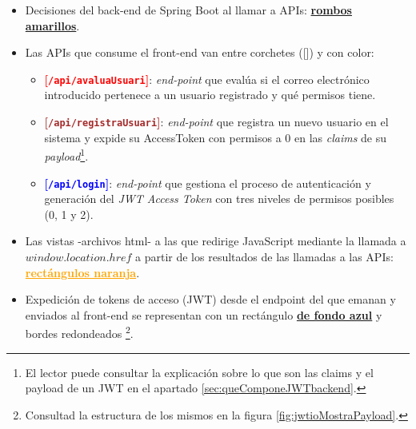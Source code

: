 \documentclass[a4paper,12pt]{report}
\begin{document}
	\begin{itemize}
		\setlength{\itemsep}{-.3em}
		
		\item Decisiones del back-end de Spring Boot al llamar a APIs: \textbf{\textcolor{yellow!75!black}{\underline{rombos amarillos}}}. %
		\item Las APIs que consume el front-end van entre corchetes ([]) y con color:
		\begin{itemize}
			\setlength{\itemsep}{.0em}
			\item \textbf{\textcolor{red}{[\texttt{/api/avaluaUsuari}]}}: \textit{end-point} que evalúa si el correo electrónico introducido pertenece a un usuario registrado y qué permisos tiene.
			\item \textbf{\textcolor{brown}{[\texttt{/api/registraUsuari}]}}: \textit{end-point} que registra un nuevo usuario en el sistema y expide su AccessToken con permisos a 0 en las \textit{claims} de su \textit{payload}\footnote{El lector puede consultar la explicación sobre lo que son las claims y el payload de un JWT en el apartado \ref{sec:queComponeJWTbackend}.}.
			\item \textbf{\textcolor{blue}{[\texttt{/api/login}]}}: \textit{end-point} que gestiona el proceso de autenticación y generación del \textit{JWT Access Token} con tres niveles de permisos posibles (0, 1 y 2).
		\end{itemize}
		
		
		
		\item Las vistas -archivos html- a las que redirige JavaScript mediante la llamada a $window.location.href$ a partir de los resultados de las llamadas a las APIs:  \textbf{\textcolor{orange}{\underline{rectángulos naranja}}}.
		
		\item Expedición de tokens de acceso (JWT) desde el endpoint del que emanan y enviados al front-end se representan con un rectángulo \textbf{\textcolor{blue!40!white}{\underline{de fondo azul}}} y bordes redondeados \footnote{Consultad la estructura de los mismos en la figura \ref{fig:jwtioMostraPayload}.}.
		
	\end{itemize}
	
	
	
\end{document}
